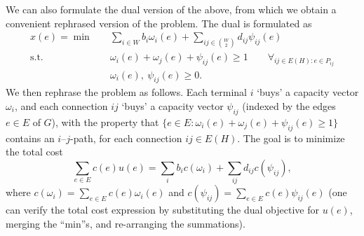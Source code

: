 We can also formulate the dual version of the above, from which we obtain a convenient rephrased version of the problem.
The dual is formulated as
\[
    \begin{split}
        x(e) = \min \quad & \sum_{i \in W} b_i \omega_i(e) + \sum_{ij \in \binom W 2} d_{ij} \psi_{ij}(e) \\
        \text{s.t.}\quad & \omega_i(e) + \omega_j(e) + \psi_{ij}(e) \ge 1 \qquad \forall_{ij \in E(H) : e \in P_{ij}} \\
        & \omega_i(e),\ \psi_{ij}(e) \ge 0.
    \end{split}
\]
We then rephrase the problem as follows.
Each terminal $i$ `buys' a capacity vector $\omega_i$, and each connection $ij$ `buys' a capacity vector $\psi_{ij}$ (indexed by the edges $e \in E$ of $G$), with the property that $\{ e \in E : \omega_i(e) + \omega_j(e) + \psi_{ij}(e) \ge 1 \}$ contains an $i$--$j$-path, for each connection $ij \in E(H)$.
The goal is to minimize the total cost
\[
    \sum_{e \in E} c(e) u(e) = \sum_{i} b_i c(\omega_i) + \sum_{ij} d_{ij} c(\psi_{ij}),
\]
where $c(\omega_i) = \sum_{e \in E} c(e) \omega_i(e)$ and $c(\psi_{ij}) = \sum_{e \in E} c(e) \psi_{ij}(e)$ (one can verify the total cost expression by substituting the dual objective for $u(e)$, merging the ``min''s, and re-arranging the summations).

